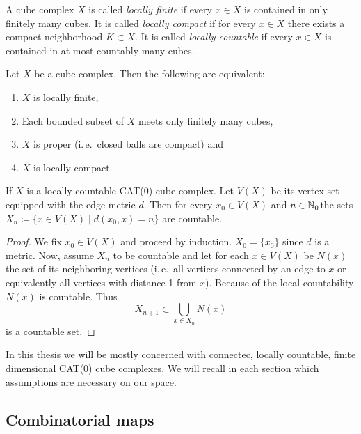 \begin{defin}
  A cube complex \(X\) is called \emph{locally finite} if every \(x \in X\) is contained in only finitely many cubes. It is called \emph{locally compact} if for every \(x \in X\) there exists a compact neighborhood \(K \subset X\). It is called \emph{locally countable} if every \(x \in X\) is contained in at most countably many cubes.
\end{defin}

\begin{prop}
  Let \(X\) be a cube complex. Then the following are equivalent:
  \begin{enumerate}
  \item \(X\) is locally finite,
  \item Each bounded subset of \(X\) meets only finitely many cubes,
  \item \(X\) is proper (i.\,e.\ closed balls are compact) and
  \item \(X\) is locally compact.
  \end{enumerate}
\end{prop}

\begin{lemma}
  \label{lem:lf-countable}
  If \(X\) is a locally countable CAT(0) cube complex. Let \(V(X)\) be its vertex set equipped with the edge metric \(d\). Then for every \(x_0 \in V(X)\) and \(n \in \mathbb{N}_0\)the sets \(X_n \coloneqq \{x \in V(X) \mid d(x_0, x) = n\}\) are countable.
\end{lemma}

\begin{proof}
  We fix \(x_0 \in V(X)\) and proceed by induction. \(X_0 = \{x_0\}\) since \(d\) is a metric. Now, assume \(X_n\) to be countable and let for each \(x \in V(X)\) be \(N(x)\) the set of its neighboring vertices (i.\,e.\ all vertices connected by an edge to \(x\) or equivalently all vertices with distance 1 from \(x\)). Because of the local countability \(N(x)\) is countable. Thus
  \[
    X_{n+1} \subset \bigcup_{x \in X_n} N(x)
  \]
  is a countable set.
\end{proof}

\begin{rem}
  In this thesis we will be mostly concerned with connectec, locally countable, finite dimensional CAT(0) cube complexes. We will recall in each section which assumptions are necessary on our space.
\end{rem}

\subsection{Combinatorial maps}
\label{sec:comb-map}

